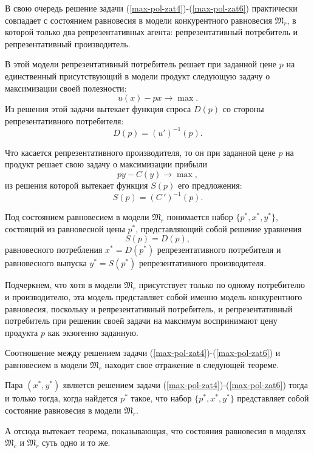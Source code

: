     В свою очередь решение задачи
(\ref{max-pol-zat4})-(\ref{max-pol-zat6})
    практически совпадает с состоянием равновесия в модели
    конкурентного равновесия $\mathfrak{M}_{r}$, в которой только
    два репрезентативных агента: репрезентативный потребитель и
    репрезентативный производитель.

    В этой модели репрезентативный потребитель решает при заданной цене $p$
    на единственный присутствующий в модели продукт следующую
    задачу о максимизации своей полезности:
    \[u(x)-px\rightarrow\max.\]
    Из решения этой задачи вытекает функция спроса $D(p)$ со стороны
    репрезентативного потребителя:
    \[D(p)=(u')^{-1}(p).\]


    Что касается репрезентативного производителя, то он при заданной цене $p$ на
    продукт решает свою задачу о максимизации прибыли
    \[py-C(y)\rightarrow\max,\]
    из решения которой вытекает функция $S(p)$  его предложения:
    \[S(p)=(C\,')^{-1}(p).\]


    Под состоянием равновесием в модели $\mathfrak{M}_{r}$ понимается набор
    $\{p^{*},x^{*},y^{*}\}$, состоящий из равновесной цены $p^{*}$,
    представляющий собой решение уравнения
    \[S(p)=D(p),\]
    равновесного потребления $x^{*}=D(p^{*})$ репрезентативного
    потребителя и равновесного выпуска $y^{*}=S(p^{*})$
    репрезентативного производителя.

    Подчеркнем, что хотя в модели $\mathfrak{M}_{r}$ присутствует
    только по одному потребителю и производителю, эта модель
    представляет собой именно модель конкурентного равновесия,
    поскольку и репрезентативный потребитель, и репрезентативный
    потребитель при решении своей задачи на максимум воспринимают
    цену продукта $p$ как экзогенно заданную.

    Соотношение между решением задачи
    (\ref{max-pol-zat4})-(\ref{max-pol-zat6}) и равновесием в модели
    $\mathfrak{M}_{r}$ находит свое отражение в следующей теореме.


\begin{teo}
    Пара $(x^{*},y^{*})$ является решением задачи
    (\ref{max-pol-zat4})-(\ref{max-pol-zat6}) тогда и только тогда,
    когда найдется $p^{*}$ такое, что набор $\{p^{*},x^{*},y^{*}\}$
    представляет собой состояние равновесия в модели
    $\mathfrak{M}_{r}$.
\end{teo}


    А отсюда вытекает теорема, показывающая, что состояния
    равновесия в моделях $\mathfrak{M}_{c}$ и $\mathfrak{M}_{r}$
    суть одно и то же.


